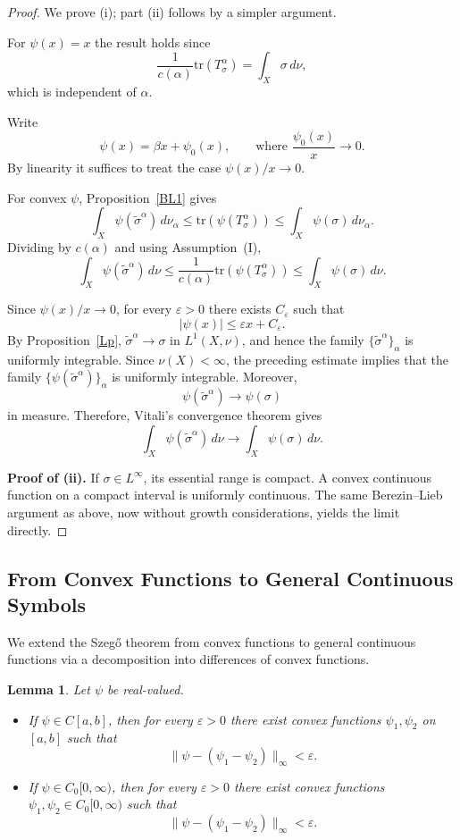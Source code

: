 \documentclass{amsart}
\newtheorem{lem}[thm]{Lemma}
\theoremstyle{definition}
\theoremstyle{remark}
\numberwithin{equation}{section}
\newcommand{\tr}{\text{tr}} %
\newcommand{\calF}{\mathcal{F}}
\begin{document}
\begin{proof}
We prove (i); part (ii) follows by a simpler argument.


For $\psi(x)=x$ the result holds since
\[
\frac{1}{c(\alpha)}\tr(T_\sigma^\alpha)
=
\int_X \sigma\, d\nu,
\]
which is independent of $\alpha$. 

Write
\[
\psi(x)=\beta x + \psi_0(x),
\qquad
\text{where } \frac{\psi_0(x)}{x}\to 0.
\]
By linearity it suffices to treat the case
$\psi(x)/x\to 0$.

For convex $\psi$, Proposition~\ref{BL1} gives
\[
\int_X \psi(\widetilde{\sigma}^\alpha)\,d\nu_\alpha
\le
\tr(\psi(T_\sigma^\alpha))
\le
\int_X \psi(\sigma)\,d\nu_\alpha.
\]
Dividing by $c(\alpha)$ and using Assumption~(I),
\[
\int_X \psi(\widetilde{\sigma}^\alpha)\,d\nu
\le
\frac{1}{c(\alpha)}\tr(\psi(T_\sigma^\alpha))
\le
\int_X \psi(\sigma)\,d\nu.
\]

Since $\psi(x)/x\to 0$, for every $\varepsilon>0$
there exists $C_\varepsilon$ such that
\[
|\psi(x)| \le \varepsilon x + C_\varepsilon.
\]
By Proposition~\ref{Lp}, $\widetilde{\sigma}^{\alpha}\to\sigma$ in
$L^1(X,\nu)$, and hence the family
$\{\widetilde{\sigma}^{\alpha}\}_{\alpha}$ is uniformly integrable.
Since $\nu(X)<\infty$, the preceding estimate implies that the family
$\{\psi(\widetilde{\sigma}^{\alpha})\}_{\alpha}$ is uniformly
integrable. Moreover,
\[
\psi(\widetilde{\sigma}^{\alpha})\longrightarrow\psi(\sigma)
\]
in measure. Therefore, Vitali's convergence theorem gives
\[
\int_X\psi(\widetilde{\sigma}^{\alpha})\,d\nu
\longrightarrow
\int_X\psi(\sigma)\,d\nu .
\]

\medskip
\noindent
\textbf{Proof of (ii).}
If $\sigma\in L^\infty$, its essential range
is compact. A convex continuous function on a compact
interval is uniformly continuous.
The same Berezin--Lieb argument as above,
now without growth considerations,
yields the limit directly.
\end{proof}

\subsection{From Convex Functions to General Continuous Symbols}

We extend the Szeg\H{o} theorem from convex functions to general continuous functions via a decomposition into differences of convex functions.

\begin{lem}\label{lem:diff_convex}
Let $\psi$ be real-valued. 
\begin{itemize}
    \item[(i)] If $\psi\in C[a,b]$, then for every $\varepsilon>0$ there exist convex functions $\psi_1,\psi_2$ on $[a,b]$ such that 
    \[
        \|\psi-(\psi_1-\psi_2)\|_{\infty} < \varepsilon.
    \]
    \item[(ii)] If $\psi\in C_0[0,\infty)$, then for every $\varepsilon>0$ there exist convex functions $\psi_1,\psi_2\in C_0[0,\infty)$ such that
    \[
        \|\psi-(\psi_1-\psi_2)\|_\infty < \varepsilon.
    \]
\end{itemize}
\end{lem}
\end{document}
